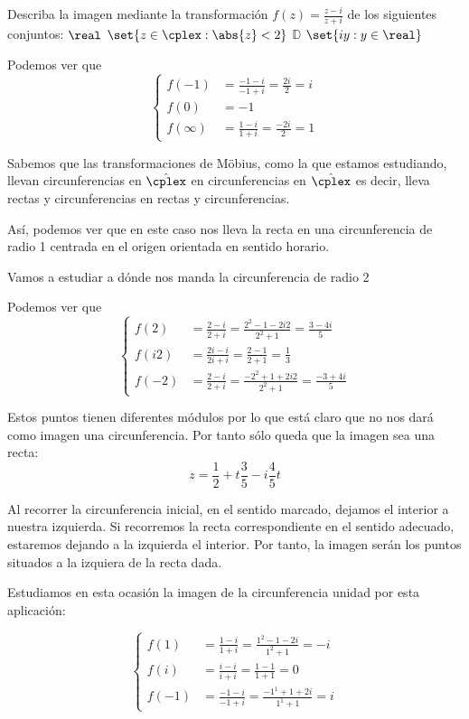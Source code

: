 \begin{problem}[7]
Describa la imagen mediante la transformación $f(z) = \frac{z - i}{z + i}$ de los siguientes conjuntos:
\ppart $\real$
\ppart $\set{z \in \cplex : \abs{z} < 2}$
\ppart $\mathbb{D}$
\ppart $\set{iy : y \in \real}$
\solution


\spart

Podemos ver que
\[\left\{\begin{aligned}
f(-1)&=\frac{-1-i}{-1+i}=\frac{2i}{2}=i\\
f(0)&=-1\\
f(\infty)&=\frac{1-i}{1+i}=\frac{-2i}{2}=1
\end{aligned}\right.\]

Sabemos que las transformaciones de Möbius, como la que estamos estudiando, llevan circunferencias en $\hat{\cplex}$ en circunferencias en $\hat{\cplex}$ es decir, lleva rectas y circunferencias en rectas y circunferencias.

Así, podemos ver que en este caso nos lleva la recta en una circunferencia de radio 1 centrada en el origen orientada en sentido horario.

\spart

Vamos a estudiar a dónde nos manda la circunferencia de radio 2

Podemos ver que
\[\left\{\begin{aligned}
f(2)&=\frac{2-i}{2+i}=\frac{2^2-1-2i2}{2^2+1}=\frac{3-4i}{5}\\
f(i2)&=\frac{2i-i}{2i+i} = \frac{2-1}{2+1}=\frac{1}{3}\\
f(-2)&=\frac{2-i}{2+i}=\frac{-2^2+1+2i2}{2^2+1}=\frac{-3+4i}{5}
\end{aligned}\right.\]

Estos puntos tienen diferentes módulos por lo que está claro que no nos dará como imagen una circunferencia. Por tanto sólo queda que la imagen sea una recta:
\[z=\frac{1}{2}+t\frac{3}{5}-i\frac{4}{5}t\]

Al recorrer la circunferencia inicial, en el sentido marcado, dejamos el interior a nuestra izquierda. Si recorremos la recta correspondiente en el sentido adecuado, estaremos dejando a la izquierda el interior. Por tanto, la imagen serán los puntos situados a la izquiera de la recta dada.

\spart

Estudiamos en esta ocasión la imagen de la circunferencia unidad por esta aplicación:

\[\left\{\begin{aligned}
f(1)&=\frac{1-i}{1+i}=\frac{1^2-1-2i}{1^2+1}=-i\\
f(i)&=\frac{i-i}{i+i} = \frac{1-1}{1+1}=0\\
f(-1)&=\frac{-1-i}{-1+i}=\frac{-1^1+1+2i}{1^1+1}=i
\end{aligned}\right.\]


\end{problem}

